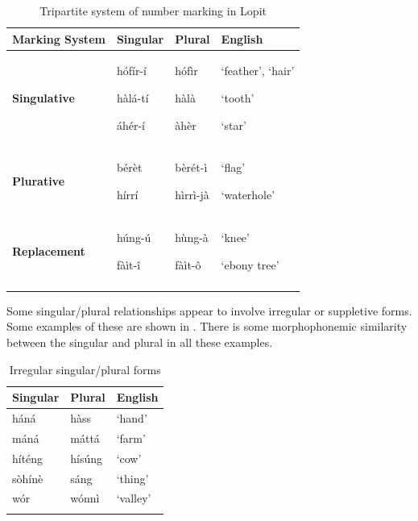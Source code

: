 \documentclass[output=paper]{langsci/langscibook}
\begin{document}
\begin{table}
\begin{tabularx}{\textwidth}{XXXX}
\lsptoprule

 \bfseries Marking System & \bfseries Singular & \bfseries Plural & \bfseries English\\ \midrule
\bfseries Singulative & {h\'{o}f\'{i}r-\'{i}}

{h\`{a}l\'{a}-t\'{i}}

\'{a}h\'{e}r-\'{i} & { h\'{o}f\`{i}r}

{ h\`{a}l\`{a}}

\`{a}h\`{e}r & ‘feather’, ‘hair’

‘tooth’

‘star’\\
\bfseries Plurative & {b\'{e}r\`{e}t}

 h\'{i}rr\'{i} & {b\`{e}r\'{e}t-\`{i}}

h\`{i}rr\`{i}-j\`{a} & ‘flag’

‘waterhole’\\
\bfseries Replacement & { h\'{u}ng-\'{u}}

 f\`{a}\`{i}t-\^{i} & { h\`{u}ng-\`{a}}

f\`{a}\`{i}t-\^{o} & ‘knee’

‘ebony tree’\\
\lspbottomrule
\end{tabularx}
\caption{Tripartite system of number marking in Lopit}
\label{tab:moodie:2}
\end{table}

Some singular/plural relationships appear to involve irregular or suppletive forms. Some examples of these are shown in . There is some morphophonemic similarity between the singular and plural in all these examples. 

\begin{table}
\begin{tabularx}{\textwidth}{XXX}
\lsptoprule
 \bfseries Singular & \bfseries Plural & \bfseries English\\ \midrule
 h\'{a}n\'{a} &  h\`{a}ss & ‘hand’\\
 m\'{a}n\'{a} &  m\'{a}tt\'{a} & ‘farm’\\
 h\'{i}t\'{e}ng &  h\'{i}s\'{u}ng & ‘cow’\\
 s\`{o}h\'{i}n\`{e} &  s\'{a}ng & ‘thing’\\
 w\'{o}r &  w\'{o}nn\`{i} & ‘valley’\\
\lspbottomrule
\end{tabularx}
\caption{Irregular singular/plural forms}
\label{tab:moodie:3}
\end{table}
\end{document}
